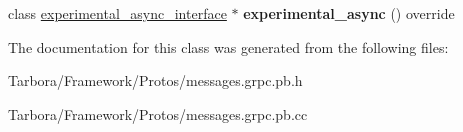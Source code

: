 \begin{DoxyCompactItemize}
\item 
\mbox{\label{classtbMessages_1_1TarboraMessages_1_1Stub_a4e67f9110dcb204e9a848781a173ee74}} 
class \hyperlink{classtbMessages_1_1TarboraMessages_1_1StubInterface_1_1experimental__async__interface}{experimental\+\_\+async\+\_\+interface} $\ast$ {\bfseries experimental\+\_\+async} () override
\end{DoxyCompactItemize}


The documentation for this class was generated from the following files\+:\begin{DoxyCompactItemize}
\item 
Tarbora/\+Framework/\+Protos/messages.\+grpc.\+pb.\+h\item 
Tarbora/\+Framework/\+Protos/messages.\+grpc.\+pb.\+cc\end{DoxyCompactItemize}
